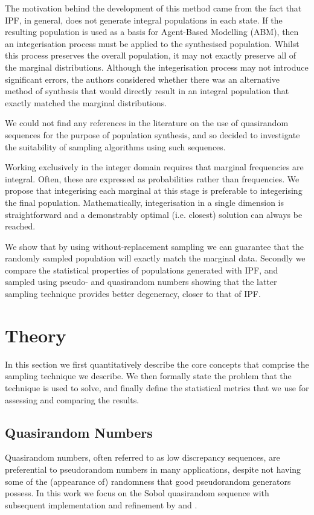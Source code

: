 \documentclass{JASSS}
\begin{document}
The motivation behind the development of this method came from the fact
that IPF, in general, does not generate integral populations in each
state. If the resulting population is used as a basis for Agent-Based
Modelling (ABM), then an integerisation process must be applied to the
synthesised population. Whilst this process preserves the overall
population, it may not exactly preserve all of the marginal
distributions. Although the integerisation process may not introduce significant errors, the
authors considered whether there was an alternative method of synthesis
that would directly result in an integral population that exactly
matched the marginal distributions.

We could not find any references in the literature on the use of
quasirandom sequences for the purpose of population synthesis, and so
decided to investigate the suitability of sampling algorithms using such
sequences.

Working exclusively in the integer domain requires that marginal frequencies are integral. Often, these are expressed as probabilities rather than frequencies. We propose that integerising each marginal at this stage is preferable to integerising the final population. Mathematically, integerisation in a single dimension is straightforward and a demonstrably optimal (i.e. closest) solution can always be reached.    

We show that by using without-replacement sampling we can guarantee that the randomly sampled population will exactly match the marginal data. Secondly we compare the statistical properties of populations generated with IPF, and sampled using pseudo- and quasirandom numbers  showing that the latter sampling technique provides better degeneracy, closer to that of IPF.

\section{Theory}\label{theory}

In this section we first quantitatively describe the core concepts that comprise the sampling technique we describe. We then formally state the problem that the technique is used to solve, and finally define the statistical metrics that we use for assessing and comparing the results.  

\subsection{Quasirandom Numbers}\label{quasirandom-numbers}
Quasirandom numbers, often referred to as low discrepancy sequences, are
preferential to pseudorandom numbers in many applications, despite not
having some of the (appearance of) randomness that good pseudorandom
generators possess. In this work we focus on the Sobol quasirandom
sequence \citep{sobol_1967} with subsequent implementation and refinement by \cite{bratley_algorithm_1988} and \cite{joe_remark_2003}.
\end{document}
